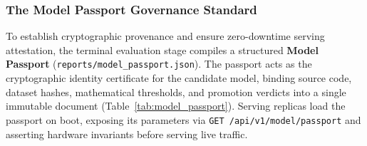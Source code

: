 \subsubsection{The Model Passport Governance Standard}
\label{sec:model_passport_spec}

To establish cryptographic provenance and ensure zero-downtime serving attestation, the terminal evaluation stage compiles a structured \textbf{Model Passport} (\nolinkurl{reports/model_passport.json}). The passport acts as the cryptographic identity certificate for the candidate model, binding source code, dataset hashes, mathematical thresholds, and promotion verdicts into a single immutable document (Table~\ref{tab:model_passport}). Serving replicas load the passport on boot, exposing its parameters via \texttt{GET /api/v1/model/passport} and asserting hardware invariants before serving live traffic.

